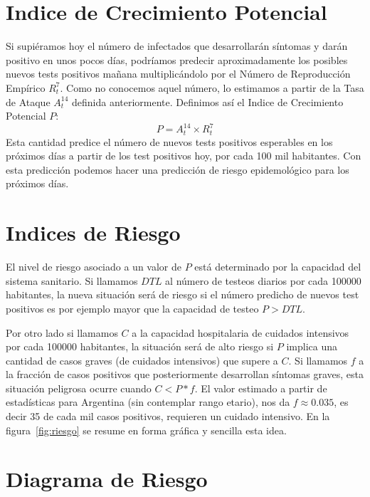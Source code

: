\documentclass[12pt,a4paper]{article}
\begin{document}
\section*{Indice de Crecimiento Potencial}

Si supiéramos hoy el número de infectados que desarrollarán síntomas 
y darán positivo en unos pocos días, podríamos predecir aproximadamente 
los posibles nuevos tests positivos mañana multiplicándolo por el Número de 
Reproducción Empírico $R^7_t$. Como no conocemos aquel número,
lo estimamos a partir de la Tasa de Ataque $A^{14}_t$ definida anteriormente.
Definimos así el Indice de Crecimiento Potencial $P$:
\begin{equation}
P = A^{14}_t \times R^7_t
\end{equation}
Esta cantidad predice el número de nuevos tests positivos 
esperables en los próximos días a partir de los 
test positivos hoy, por cada 100 mil habitantes. 
Con esta predicción podemos hacer una predicción de 
riesgo epidemológico para los próximos días. 


\section*{Indices de Riesgo}

El nivel de riesgo asociado a un valor de $P$ está determinado por la capacidad 
del sistema sanitario. Si llamamos $DTL$ al número de testeos diarios por 
cada 100000 habitantes, la nueva situación será de riesgo si el número predicho 
de nuevos test positivos es por ejemplo mayor que la
capacidad de testeo $P > DTL$.

Por otro lado si llamamos $C$ a la capacidad hospitalaria de cuidados intensivos 
por cada 100000 habitantes, la situación será de alto riesgo si $P$ implica una 
cantidad de casos graves (de cuidados intensivos) que supere a $C$.
Si llamamos $f$ a la fracción de casos positivos que posteriormente 
desarrollan síntomas graves, esta situación peligrosa ocurre cuando 
$C < P * f$. El valor estimado a partir de estadísticas para Argentina 
(sin contemplar rango etario), nos da $f\approx 0.035$, es decir 35 de 
cada mil casos positivos, requieren un cuidado intensivo. 
En la figura~\ref{fig:riesgo} se resume en forma gráfica y sencilla esta idea.

\section*{Diagrama de Riesgo}
\end{document}
